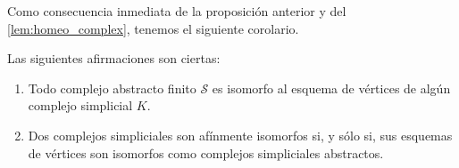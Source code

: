 Como consecuencia inmediata de la proposición anterior y del \autoref{lem:homeo_complex},
tenemos el siguiente corolario.

\begin{corolario}
	Las siguientes afirmaciones son ciertas:
	\begin{enumerate}[label=(\alph{*})]
		\item Todo complejo abstracto finito $\mathcal{S}$ es isomorfo al esquema de
		vértices de algún complejo simplicial $K$.
		
		\item Dos complejos simpliciales son afínmente isomorfos si, y sólo si, sus esquemas
		de vértices son isomorfos como complejos simpliciales abstractos.
	\end{enumerate}
\end{corolario}

\endinput
